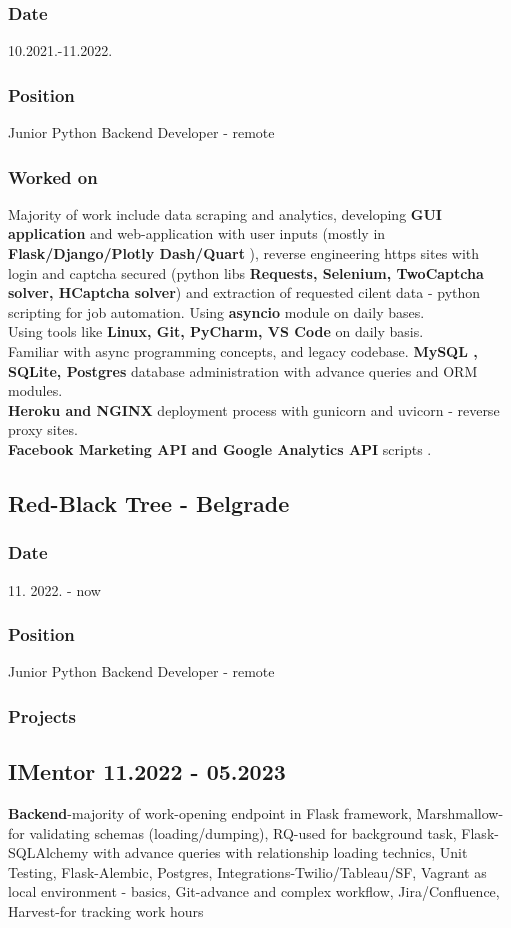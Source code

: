 \documentclass[10pt]{article}
\begin{document}
\subsubsection{Date}
10.2021.-11.2022.
\subsubsection{Position}
Junior Python Backend Developer - remote
\subsubsection{Worked on}
Majority of work include data scraping and analytics, developing \textbf{GUI application} and web-application with user inputs (mostly in \textbf{ Flask/Django/Plotly Dash/Quart} ), reverse engineering
https sites with login and captcha secured (python libs \textbf{Requests, Selenium, TwoCaptcha solver, HCaptcha solver}) and extraction of requested cilent data - python scripting for job automation. Using \textbf{asyncio} module on daily bases.
\\ Using tools like \textbf{Linux, Git,  PyCharm, VS Code} on daily basis.  \\
Familiar with async programming concepts, and legacy codebase.
\textbf{MySQL , SQLite,  Postgres} database administration with advance queries and ORM modules.\\
\textbf{Heroku and NGINX} deployment process with gunicorn and uvicorn - reverse proxy sites.\\
\textbf{Facebook Marketing API and Google Analytics API} scripts .\\

\subsection{\large{Red-Black Tree - Belgrade}}
\subsubsection{Date}
11. 2022. -  now
\subsubsection{Position}
Junior Python Backend Developer - remote
\subsubsection{Projects}
\subsection{{\textbf{IMentor} 11.2022 - 05.2023}}
\textbf{Backend}-majority of work-opening endpoint in Flask framework,
Marshmallow-for validating schemas (loading/dumping),
RQ-used for background task,
Flask-SQLAlchemy with advance queries with relationship loading technics,
Unit Testing,
Flask-Alembic,
Postgres,
Integrations-Twilio/Tableau/SF,
Vagrant as local environment - basics,
Git-advance and complex workflow,
Jira/Confluence,
Harvest-for tracking work hours
\end{document}
